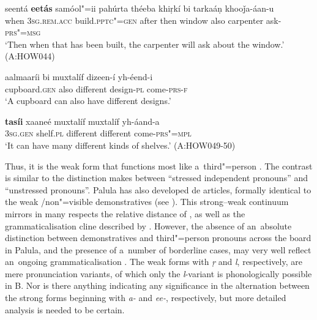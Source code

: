 \begin{exe}
\ex
\label{ex:5-16}
\gll seentá \textbf{eetás} samóol"=ii pahúrta théeba khiṛkí bi tarkaáṇ
khooǰa-áan-u\\
when \textsc{3sg}.\textsc{rem.acc} build.\textsc{pptc"=gen} after then window also carpenter ask-\textsc{prs"=msg} \\
\glt `Then when that has been built, the carpenter will ask about the window.' (A:HOW044)
\end{exe}


\begin{exe}
\ex
\label{ex:5-17}
\gll aalmaaríi bi muxtalíf dizeen-í yh-éend-i\\
cupboard.\textsc{gen} also different design-\textsc{pl} come-\textsc{prs-f}\\
\glt `A cupboard can also have different designs.' 

\gll \textbf{tasíi} xaaneé muxtalíf muxtalíf yh-áand-a \\
\textsc{3sg.gen} shelf.\textsc{pl} different different come-\textsc{prs"=mpl} \\
\glt `It can have many different kinds of shelves.' (A:HOW049-50)
\end{exe}

Thus, it is the weak form that functions most like a~third"=person . The contrast is similar to the distinction \citet[417--419]{givon2001a} makes between ``stressed independent pronouns'' and ``unstressed  pronouns''. Palula has also developed de articles, formally identical to the  weak /non"=visible demonstratives (see ). This strong--weak continuum mirrors in many respects the relative  distance of \citet[419]{givon2001a}, as well as the grammaticalisation cline described by \citet[432]{diessel2006}. However, the absence of an~absolute distinction between demonstratives and third"=person pronouns across the board in Palula, and the presence of a~number of borderline cases, may very well reflect an~ongoing grammaticalisation \citep[213]{himmelmann1996}. The weak  forms with \textit{ṛ} and \textit{l}, respectively, are mere pronunciation variants, of which only the \textit{l}-variant is phonologically possible in B. Nor is there anything indicating any significance in the alternation between the strong  forms beginning with \textit{a-} and \textit{ee-}, respectively, but more detailed analysis is needed to be certain.




